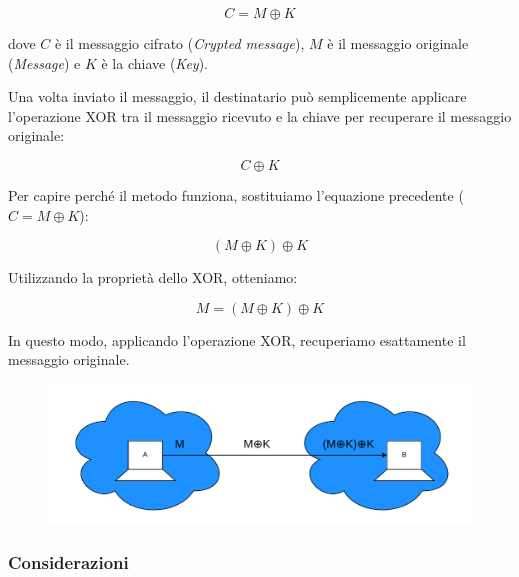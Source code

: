 \documentclass{report}
\begin{document}
\begin{equation*}
    C = M \oplus K 
\end{equation*}

dove \(C\) è il messaggio cifrato (\textit{Crypted message}), \(M\) è il messaggio originale (\textit{Message}) e \(K\) è la chiave (\textit{Key}).  

Una volta inviato il messaggio, il destinatario può semplicemente applicare l'operazione XOR tra il messaggio ricevuto e la chiave per recuperare il messaggio originale:  

\begin{equation*}
   C \oplus K
\end{equation*}

Per capire perché il metodo funziona, sostituiamo l'equazione precedente (\(C = M \oplus K\)):  

\begin{equation*}
    (M \oplus K) \oplus K
\end{equation*}

Utilizzando la proprietà dello XOR, otteniamo:  

\begin{equation*}
    M = (M \oplus K) \oplus K 
\end{equation*}

In questo modo, applicando l'operazione XOR, recuperiamo esattamente il messaggio originale.  














\begin{figure}[h]
    \centering
    \includegraphics[width=0.9\linewidth]{logos/3_1cripto.pdf}
\end{figure}


\subsubsection{Considerazioni}
\end{document}
